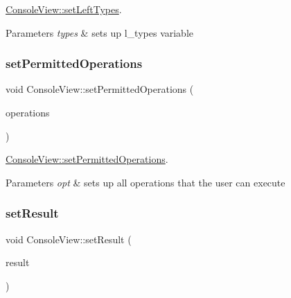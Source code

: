 \hyperlink{class_console_view_a7dcc84dc917fb81babae471315e9cefd}{Console\+View\+::set\+Left\+Types}. 


\begin{DoxyParams}{Parameters}
{\em types} & sets up l\+\_\+types variable \\
\hline
\end{DoxyParams}
\mbox{\label{class_console_view_a17864810f831eb58d8be275a2eaa461d}} 
\subsubsection{\texorpdfstring{set\+Permitted\+Operations}{setPermittedOperations}}
{\footnotesize\ttfamily void Console\+View\+::set\+Permitted\+Operations (\begin{DoxyParamCaption}\item[{const Q\+Vector$<$ Q\+String $>$}]{operations }\end{DoxyParamCaption})\hspace{0.3cm}{\ttfamily [slot]}}



\hyperlink{class_console_view_a17864810f831eb58d8be275a2eaa461d}{Console\+View\+::set\+Permitted\+Operations}. 


\begin{DoxyParams}{Parameters}
{\em opt} & sets up all operations that the user can execute \\
\hline
\end{DoxyParams}
\mbox{\label{class_console_view_a0b43a9e8d693b227fcd3a00b7a384e37}} 
\subsubsection{\texorpdfstring{set\+Result}{setResult}}
{\footnotesize\ttfamily void Console\+View\+::set\+Result (\begin{DoxyParamCaption}\item[{const Q\+Vector$<$ Q\+String $>$}]{result }\end{DoxyParamCaption})\hspace{0.3cm}{\ttfamily [slot]}}



